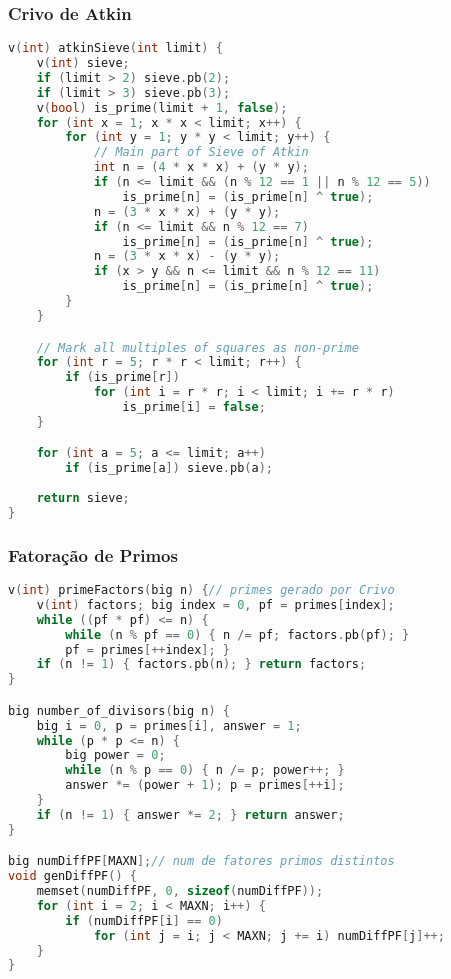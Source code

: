 \subsubsection{Crivo de Atkin}
\begin{lstlisting}[language=C++]
v(int) atkinSieve(int limit) {
    v(int) sieve;
    if (limit > 2) sieve.pb(2);
    if (limit > 3) sieve.pb(3);
    v(bool) is_prime(limit + 1, false);
    for (int x = 1; x * x < limit; x++) {
        for (int y = 1; y * y < limit; y++) {
            // Main part of Sieve of Atkin
            int n = (4 * x * x) + (y * y);
            if (n <= limit && (n % 12 == 1 || n % 12 == 5))
                is_prime[n] = (is_prime[n] ^ true);
            n = (3 * x * x) + (y * y);
            if (n <= limit && n % 12 == 7)
                is_prime[n] = (is_prime[n] ^ true);
            n = (3 * x * x) - (y * y);
            if (x > y && n <= limit && n % 12 == 11)
                is_prime[n] = (is_prime[n] ^ true);
        }
    }

    // Mark all multiples of squares as non-prime
    for (int r = 5; r * r < limit; r++) {
        if (is_prime[r])
            for (int i = r * r; i < limit; i += r * r)
                is_prime[i] = false;
    }

    for (int a = 5; a <= limit; a++)
        if (is_prime[a]) sieve.pb(a);
    
    return sieve;
}
\end{lstlisting}

\newpage

\subsubsection{Fatoração de Primos}
\begin{lstlisting}[language=C++]
v(int) primeFactors(big n) {// primes gerado por Crivo
    v(int) factors; big index = 0, pf = primes[index];
    while ((pf * pf) <= n) {
        while (n % pf == 0) { n /= pf; factors.pb(pf); }
        pf = primes[++index]; }
    if (n != 1) { factors.pb(n); } return factors;
}

big number_of_divisors(big n) {
	big i = 0, p = primes[i], answer = 1;
	while (p * p <= n) {
		big power = 0;
		while (n % p == 0) { n /= p; power++; }
		answer *= (power + 1); p = primes[++i];
	}
	if (n != 1) { answer *= 2; } return answer;
}

big numDiffPF[MAXN];// num de fatores primos distintos
void genDiffPF() {
	memset(numDiffPF, 0, sizeof(numDiffPF));
	for (int i = 2; i < MAXN; i++) {
		if (numDiffPF[i] == 0)
			for (int j = i; j < MAXN; j += i) numDiffPF[j]++;
	}
}
\end{lstlisting}